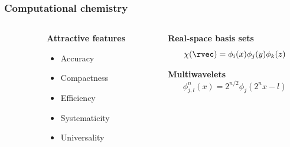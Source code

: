 \begin{frame}
    \frametitle{Computational chemistry}
    \begin{columns}
    \begin{column}{.10\textwidth}
    \end{column}
    \begin{column}{.30\textwidth}
    \textbf{Attractive features}
    \begin{itemize}
        \item {\color{green} Accuracy}
        \item {\color{red} Compactness}
        \item {\color{green} Efficiency}
        \item {\color{green} Systematicity}
        \item {\color{green} Universality}
    \end{itemize}
    \end{column}
    \begin{column}{.60\textwidth}
    \centering
    \textbf{Real-space basis sets}
    \begin{equation}
        \nonumber
        \chi(\rvec) = \phi_i(x)\phi_j(y)\phi_k(z)
    \end{equation}
    
    \vspace{4.2mm}

    \textbf{Multiwavelets}
    \begin{equation}
        \nonumber
        \phi_{j,l}^n(x) = 2^{n/2}\phi_j(2^nx-l)
    \end{equation}
    \end{column}
    \end{columns}    

    \vspace{5mm}


\end{frame}
